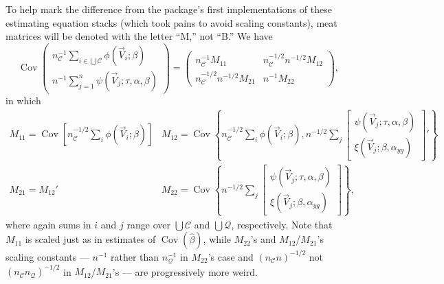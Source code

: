 \documentclass{article}
\begin{document}
To help mark the difference from the package's first implementations of these estimating equation stacks (which took pains to avoid scaling constants),
meat matrices will be denoted with the letter ``M,'' not ``B.''
We have
\[
\operatorname{Cov}\left(
     \begin{array}{c}
       n_{\mathcal{C}}^{-1}\sum_{i\in \bigcup \mathcal{C}}\phi(\vec{V}_{i}; \beta )\\
       n^{-1}\sum_{j=1}^{n}\psi(\vec{V}_{j}; \tau, \alpha, \beta )
     \end{array}
\right) = \left(
  \begin{array}{cc}
    n_{\mathcal{C}}^{-1}M_{11}& n_{\mathcal{C}}^{-1/2}n^{-1/2} M_{12}\\
    n_{\mathcal{C}}^{-1/2}n^{-1/2} M_{21} & n^{-1}M_{22}
  \end{array}
\right),
\]
in which
\[
  \begin{array}{cc}
    M_{11}  = \operatorname{Cov}[n_{\mathcal{C}}^{-1/2}\sum_{i} \phi(\vec{V}_{i}; \beta )] &
                                                                  M_{12}=
                                                                  \operatorname{Cov}\left\{n_{\mathcal{C}}^{-1/2}\sum_{i}\phi(\vec{V}_{i};
                                                                  \beta
                                                                  ), n^{-1/2}\sum_{j}\begin{bmatrix}\psi(\vec{V}_{j}; \tau, \alpha, \beta ) \\ \xi(\vec{V}_{j}; \beta, \alpha_{yg})\end{bmatrix}'\right\}\\
    M_{21}=M_{12}' & M_{22} = \operatorname{Cov}\left\{n^{-1/2}\sum_{j}
                     \begin{bmatrix}\psi(\vec{V}_{j};
                     \tau, \alpha, \beta)\\ \xi(\vec{V}_{j}; \beta, \alpha_{yg})\end{bmatrix}\right\} ,
    \end{array}
  \]
where again sums in $i$ and $j$ range over $\bigcup \mathcal{C}$ and $\bigcup\mathcal{Q}$, respectively.
Note that $M_{11}$ is scaled just as in estimates of $\operatorname{Cov}(\hat\beta)$, while $M_{22}$'s and
$M_{12}$/$M_{21}$'s scaling constants --- $n^{-1}$ rather than
$n_{\mathcal{Q}}^{-1}$ in $M_{22}$'s
case and $(n_{\mathcal{C}}n)^{-1/2}$ not $(n_{\mathcal{C}} n_{\mathcal{Q}})^{-1/2}$ in $M_{12}$/$M_{21}$'s --- are progressively more weird.
\end{document}
